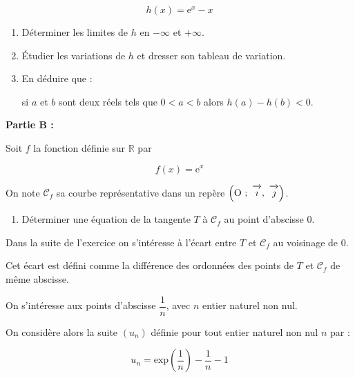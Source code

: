 \documentclass[11pt,a4paper,french]{article}
\newcommand{\R}{\mathbb{R}}
\newcommand{\vect}[1]{\overrightarrow{\,\mathstrut#1\,}}
\def\Oij{$\left(\text{O}~;~\vect{\imath},~\vect{\jmath}\right)$}
\begin{document}
\[h(x) = \text{e}^x - x\]

\smallskip

\begin{enumerate}
\item Déterminer les limites de $h$ en $-\infty$ et $+\infty$.
\item Étudier les variations de $h$ et dresser son tableau de variation. 
\item En déduire que :

si $a$ et $b$ sont deux réels tels que $0 < a < b$ alors $h(a) - h(b) < 0$.
\end{enumerate}

\bigskip

\textbf{Partie B :}

\medskip

Soit $f$ la fonction définie sur $\R$ par

\[f(x) = \text{e}^x\]

On note $\mathcal{C}_f$ sa courbe représentative dans un repère \Oij.

\medskip

\begin{enumerate}
\item Déterminer une équation de la tangente $T$ à $\mathcal{C}_f$ au point d'abscisse 0.
\end{enumerate}

Dans la suite de l'exercice on s'intéresse à l'écart entre $T$ et $\mathcal{C}_f$ au voisinage de $0$.

Cet écart est défini comme la différence des ordonnées des points de $T$ et $\mathcal{C}_f$ de même abscisse.

On s'intéresse aux points d'abscisse $\dfrac{1}{n}$, avec $n$ entier naturel non nul.

On considère alors la suite $\left(u_n\right)$ définie pour tout entier naturel non nul $n$ par :

\[u_n = \text{exp} \left(\dfrac{1}{n}\right) - \dfrac{1}{n} - 1\]
\end{document}
